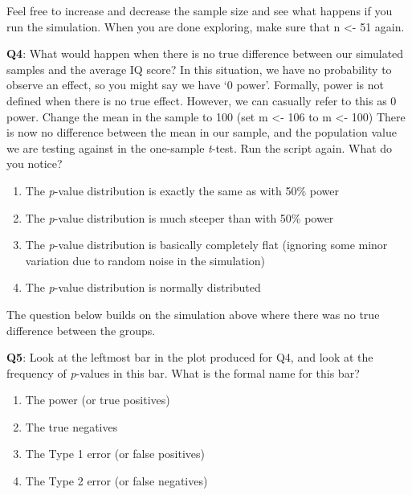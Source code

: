 \documentclass[
  oneside]{krantz}
\providecommand{\tightlist}{%
  \setlength{\itemsep}{0pt}\setlength{\parskip}{0pt}}
\begin{document}
Feel free to increase and decrease the sample size and see what happens if you run the simulation. When you are done exploring, make sure that n \textless- 51 again.

\textbf{Q4}: What would happen when there is no true difference between our simulated samples and the average IQ score? In this situation, we have no probability to observe an effect, so you might say we have `0 power'. Formally, power is not defined when there is no true effect. However, we can casually refer to this as 0 power. Change the mean in the sample to 100 (set m \textless- 106 to m \textless- 100) There is now no difference between the mean in our sample, and the population value we are testing against in the one-sample \emph{t}-test. Run the script again. What do you notice?

\begin{enumerate}
\def\labelenumi{\Alph{enumi})}
\tightlist
\item
  The \emph{p}-value distribution is exactly the same as with 50\% power
\item
  The \emph{p}-value distribution is much steeper than with 50\% power
\item
  The \emph{p}-value distribution is basically completely flat (ignoring some minor variation due to random noise in the simulation)
\item
  The \emph{p}-value distribution is normally distributed
\end{enumerate}

The question below builds on the simulation above where there was no true difference between the groups.

\textbf{Q5}: Look at the leftmost bar in the plot produced for Q4, and look at the frequency of \emph{p}-values in this bar. What is the formal name for this bar?

\begin{enumerate}
\def\labelenumi{\Alph{enumi})}
\tightlist
\item
  The power (or true positives)
\item
  The true negatives
\item
  The Type 1 error (or false positives)
\item
  The Type 2 error (or false negatives)
\end{enumerate}
\end{document}
